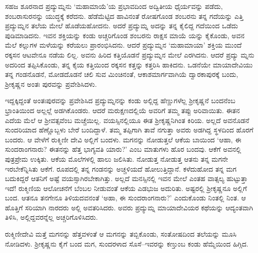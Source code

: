 ಸಹಜ ಶೂರನಾದ ಪ್ರದ್ಯುಮ್ನನು ‘ಮಹಾಮಾಯೆ’ಯ ಪ್ರಭಾವದಿಂದ ಅದ್ವಿತೀಯ ಧೈರ್ಯವನ್ನು ಪಡೆದು, ಶಂಬರಾಸುರನನ್ನು ಯುದ್ಧಕ್ಕೆ ಕರೆದನು. ಹೆಡೆಮೆಟ್ಟಿದ ಹಾವಿನಂತೆ ರೋಷಗೊಂಡ ಶಂಬರನು ತನ್ನ ಗದೆಯನ್ನು ಎತ್ತಿ ಪ್ರದ್ಯುಮ್ನನ ತಲೆಯ ಮೇಲೆ ಹೊಡೆಯಹೋದನು. ಅದರೆ ಪ್ರದ್ಯುಮ್ನ ಅದನ್ನು ತನ್ನ ಕೈಲಿದ್ದ ಗದೆಯಿಂದ ಒಡೆದು ಪುಡಿಮಾಡಿದನು. ಇವನ ಶಕ್ತಿಯನ್ನು ಕಂಡು ಅಚ್ಚರಿಗೊಂಡ ಶಂಬರನು ರಾಕ್ಷಸ ಮಾಯೆ ಯನ್ನು ಕೈಕೊಂಡು, ಅವನ ಮೆಲೆ ಕಲ್ಲುಗಳ ಮಳೆಯನ್ನು ಕರೆಯಲು ಪ್ರಾರಂಭಿಸಿದನು. ಆದರೆ ಪ್ರದ್ಯುಮ್ನನ ‘ಮಹಾಮಾಯಾ’ ಶಕ್ತಿಯ ಮುಂದೆ ರಕ್ಕಸನ ಆಟವೇನೂ ನಡೆಯ ಲಿಲ್ಲ. ಅವನು ಹಿರಿದ ಕತ್ತಿಯೊಡನೆ ಪ್ರದ್ಯುಮ್ನನ ಮೇಲೆ ಎರಗಿದನು. ಆದರೆ ಪ್ರದ್ಯು ಮ್ನನು ಅದರಿಂದ ತಪ್ಪಿಸಿಕೊಂಡು, ತನ್ನ ಕೈಯ ಕತ್ತಿಯಿಂದ ರಕ್ಕಸನ ಕತ್ತನ್ನು ಕತ್ತರಿಸಿ ಹಾಕಿದನು. ಒಡನೆಯೇ ಮಾಯಾದೇವಿಯು ತನ್ನ ಗಂಡನೊಡನೆ, ಮೋಡದೊಡನೆ ಚಲಿ ಸುವ ಮಿಂಚಿನಂತೆ, ಆಕಾಶಮಾರ್ಗವಾಗಿಯೆ ದ್ವಾರಕಾಪುರಕ್ಕೆ ಬಂದು, ಶ್ರೀಕೃಷ್ಣನ ಅಂತಃ ಪುರವನ್ನು ಪ್ರವೇಶಿಸಿದಳು.

ಇದ್ದಕ್ಕಿದ್ದಂತೆ ಅಂತಃಪುರವನ್ನು ಪ್ರವೇಶಿಸಿದ ಪ್ರದ್ಯುಮ್ನನನ್ನು ಕಂಡು ಅಲ್ಲಿದ್ದ ಹೆಣ್ಣುಗಳೆಲ್ಲ ಶ್ರೀಕೃಷ್ಣನೆ ಬಂದನೆಂಬ ಭ್ರಾಂತಿಯಿಂದ ಅಲ್ಲಲ್ಲೆ ಅಡಗಿಕೊಂಡರು. ಆದರೆ ಮರುಕ್ಷಣದಲ್ಲಿಯೆ ಅವರಿಗೆ ತಮ್ಮ ತಪ್ಪು ಅರಿವಾಯಿತು. ಈತನ ಎದೆಯ ಮೆಲೆ ಆ ಶ್ರೀವತ್ಸವೆಂಬ ಮಚ್ಚೆಯಿಲ್ಲ. ವಯಸ್ಸಿನಲ್ಲಿಯೂ ಈತ ಶ್ರೀಕೃಷ್ಣನಿಗಿಂತ ಕಿರಿಯ. ಅಲ್ಲದೆ ಅವನೊಡನೆ ಸುಂದರಿಯಾದ ಹೆಣ್ಣೊಬ್ಬಳು ಬೇರೆ ಬಂದಿದ್ದಾಳೆ. ತಮ್ಮ ತಪ್ಪಿಗಾಗಿ ತಾವೆ ನಗುತ್ತಾ ಅವರು ಅಡಗಿದ್ದ ಸ್ಥಳದಿಂದ ಹೊರಗೆ ಬಂದರು. ಆ ವೇಳೆಗೆ ರುಕ್ಮಿಣೀ ದೇವಿ ಅಲ್ಲಿಗೆ ಬಂದಳು. ಮಗನನ್ನು ನೋಡುತ್ತಲೆ ಆಕೆಯ ಬಾಯಿಂದ ‘ಆಹಾ, ಈ ಸುಂದರಾಂಗನಾರು? ಈತನನ್ನು ಹೆತ್ತ ಭಾಗ್ಯವತಿ ಯಾರು?’ ಎಂಬ ಮಾತುಗಳು ಹೊರ ಬಂದವು. ಆಕೆಗೆ ಅವನಲ್ಲಿ ಪುತ್ರಪ್ರೇಮ ಉಕ್ಕಿತು. ಆಕೆಯ ಮೊಲೆಗಳಲ್ಲಿ ಹಾಲು ಜಲಿಸಿತು. ನೋಡುತ್ತ ನೋಡುತ್ತ ಆತನು ತನ್ನ ಮಗನೇ ಇರಬೇಕೆನ್ನಿಸಿತು ಆಕೆಗೆ. ರೂಪದಲ್ಲಿ ತನ್ನ ಗಂಡನನ್ನು ಅಚ್ಚಳಿಯದೆ ಹೋಲುತ್ತಿದ್ದಾನೆ. ಕಳೆದುಹೋದ ತನ್ನ ಮಗ ಬದುಕಿದ್ದರೆ ಆತನಿಗೆ ಅಷ್ಟೆ ವಯಸ್ಸಾಗಿರಬೇಕಾಗಿತ್ತು. ಅಲ್ಲದೆ ಮನಸ್ಸಿನಲ್ಲಿ ಇವನ ಮೇಲೆ ಎಂತಹ ವಾತ್ಸಲ್ಯ ಹುಟ್ಟುತ್ತಾ ಇದೆ! ರುಕ್ಮಿಣಿಯ ಆಲೋಚನೆಗೆ ಬೆಂಬಲ ನೀಡುವಂತೆ ಆಕೆಯ ಎಡಭುಜ ಅದುರಿತು. ಅಷ್ಟರಲ್ಲಿ ಶ್ರೀಕೃಷ್ಣನೂ ಅಲ್ಲಿಗೆ ಬಂದ. ಆತನೂ ತನಗೇನೂ ತಿಳಿಯದವನಂತೆ ‘ಅಹಾ, ಈ ಸುಂದರಾಂಗನಾರು?’ ಎಂದುಕೊಂಡು ನಿಂತಲ್ಲಿ ನಿಂತ. ಆ ಹೊತ್ತಿಗೆ ಸರಿಯಾಗಿ ನಾರದರು ಅಲ್ಲಿ ಅವತರಿಸಿದರು. ಅವರು ಪ್ರದ್ಯುಮ್ನ ಮಾಯಾದೇವಿಯರ ಕಥೆಯನ್ನು ಆದ್ಯಂತವಾಗಿ ತಿಳಿಸಿ, ಅಲ್ಲಿದ್ದವರನ್ನೆಲ್ಲ ಅಚ್ಚರಿಗೊಳಿಸಿದರು.

ರುಕ್ಮಿಣೀದೇವಿ ಮತ್ತೆ ಮಗನನ್ನು ಹೆತ್ತವಳಂತೆ ಆ ಮಗನನ್ನು ತಬ್ಬಿಕೊಂಡು, ಸಂತೋಷದಿಂದ ತಲೆಯನ್ನು ಮೂಸಿ ನೋಡಿದಳು. ಶ್ರೀಕೃಷ್ಣನು ಕೈಗೆ ಬಂದ ಮಗ, ಸುಂದರಳಾದ ಸೊಸೆ–ಇವರನ್ನು ಕಣ್ತುಂಬ ಕಂಡು ಹೆಮ್ಮೆಯಿಂದ ಹಿಗ್ಗಿದ.

